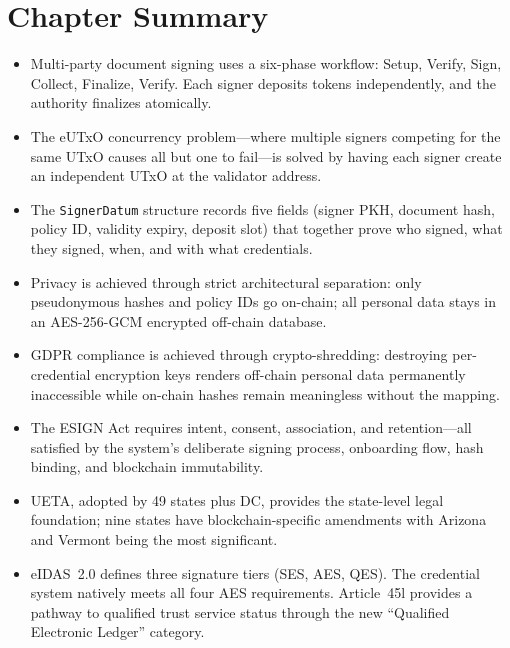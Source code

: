 \section*{Chapter Summary}

\begin{itemize}[leftmargin=*, itemsep=4pt]
  \item Multi-party document signing uses a six-phase workflow: Setup,
    Verify, Sign, Collect, Finalize, Verify.  Each signer deposits tokens
    independently, and the authority finalizes atomically.
  \item The eUTxO concurrency problem---where multiple signers competing for
    the same UTxO causes all but one to fail---is solved by having each
    signer create an independent UTxO at the validator address.
  \item The \texttt{SignerDatum} structure records five fields (signer PKH,
    document hash, policy ID, validity expiry, deposit slot) that together
    prove who signed, what they signed, when, and with what credentials.
  \item Privacy is achieved through strict architectural separation: only
    pseudonymous hashes and policy IDs go on-chain; all personal data stays
    in an AES-256-GCM encrypted off-chain database.
  \item GDPR compliance is achieved through crypto-shredding: destroying
    per-credential encryption keys renders off-chain personal data
    permanently inaccessible while on-chain hashes remain meaningless
    without the mapping.
  \item The ESIGN Act requires intent, consent, association, and retention---all
    satisfied by the system's deliberate signing process, onboarding flow,
    hash binding, and blockchain immutability.
  \item UETA, adopted by 49 states plus DC, provides the state-level legal
    foundation; nine states have blockchain-specific amendments with Arizona
    and Vermont being the most significant.
  \item eIDAS~2.0 defines three signature tiers (SES, AES, QES).  The
    credential system natively meets all four AES requirements.  Article~45l
    provides a pathway to qualified trust service status through the new
    ``Qualified Electronic Ledger'' category.
\end{itemize}
